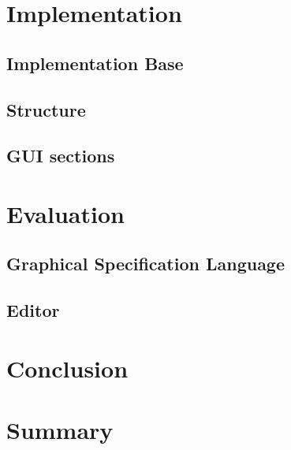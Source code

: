 \documentclass[twoside, openright, 12pt]{book}
\begin{document}
\cleardoublepage
\chapter{Implementation}
\label{implementation}

\section{Implementation Base}
\label{implementation_base}

\section{Structure}
\label{implementation_structure}
		
\section{GUI sections}
\label{implementation_sections}



\cleardoublepage
\chapter{Evaluation}
\label{evaluation}

\section{Graphical Specification Language}
\label{evaluation_gsl}

\section{Editor}
\label{evaluation_editor}


\cleardoublepage
\chapter{Conclusion}
\label{conclusion}
\blindtext



\cleardoublepage
\chapter{Summary}
\label{summary}
\blindtext
\end{document}

